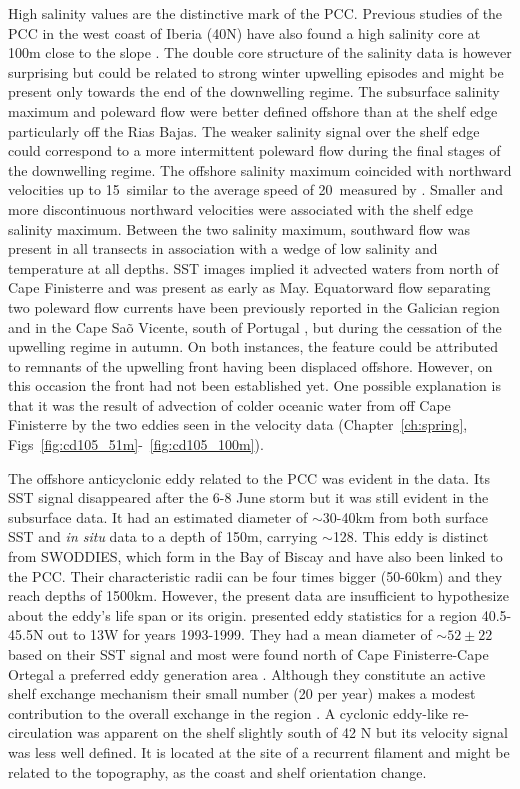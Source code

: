 High salinity values are the distinctive mark of the PCC. Previous
studies of the PCC in the west coast of Iberia (40\deg N) have
also found a high salinity core at 100m close to the slope
\citep{Frouin90,Haynes90}. The double core structure of the
salinity data is however surprising but could be related to strong
winter upwelling episodes and might be present only towards the
end of the downwelling regime. The subsurface salinity maximum and
poleward flow were better defined offshore than at the shelf edge
particularly off the Rias Bajas. The weaker salinity signal over
the shelf edge could correspond to a more intermittent poleward
flow during the final stages of the downwelling regime. The
offshore salinity maximum coincided with northward velocities up
to 15\velc\, similar to the average speed of 20\velc\, measured by
\citet{Haynes90}. Smaller and more discontinuous northward
velocities were associated with the shelf edge salinity maximum.
Between the two salinity maximum, southward flow was present in
all transects in association with a wedge of low salinity and
temperature at all depths. SST images implied it advected waters
from north of Cape Finisterre and was present as early as May.
Equatorward flow separating two poleward flow currents have been
previously reported in the Galician region \citep{Sordo01} and in
the Cape Sa\~o Vicente, south of Portugal \citep{Almeida99}, but
during the cessation of the upwelling regime in autumn. On both
instances, the feature could be attributed to remnants of the
upwelling front having been displaced offshore. However, on this
occasion the front had not been established yet. One possible
explanation is that it was the result of advection of colder
oceanic water from off Cape Finisterre by the two eddies seen in
the velocity data (Chapter~\ref{ch:spring},
Figs~\ref{fig:cd105_51m}-~\ref{fig:cd105_100m}).

The offshore anticyclonic eddy related to the PCC was evident in
the data. Its SST signal disappeared after the 6-8 June storm but
it was still evident in the subsurface data. It had an estimated
diameter of $\sim$30-40km from both surface SST and \emph{in situ}
data to a depth of 150m, carrying $\sim$128\vol. This eddy is
distinct from SWODDIES, which form in the Bay of Biscay
\citep{Pingree94} and have also been linked to the PCC. Their
characteristic radii can be four times bigger (50-60km) and they
reach depths of 1500km. However, the present data are insufficient
to hypothesize about the eddy's life span or its origin.
\citet{Huthnance02} presented eddy statistics for a region
40.5-45.5\deg N out to 13\deg W for years 1993-1999. They had a
mean diameter of $\sim 52\pm 22$ based on their SST signal and
most were found north of Cape Finisterre-Cape Ortegal a preferred
eddy generation area \citep{Dubert98,Paillet02}. Although they
constitute an active shelf exchange mechanism their small number
(20 per year) makes a modest contribution to the overall exchange
in the region \citep{Huthnance02}. A cyclonic eddy-like
re-circulation was apparent on the shelf slightly south of 42\deg
N but its velocity signal was less well defined. It is located at
the site of a recurrent filament \citep{Haynes93} and might be
related to the topography, as the coast and shelf orientation
change.

